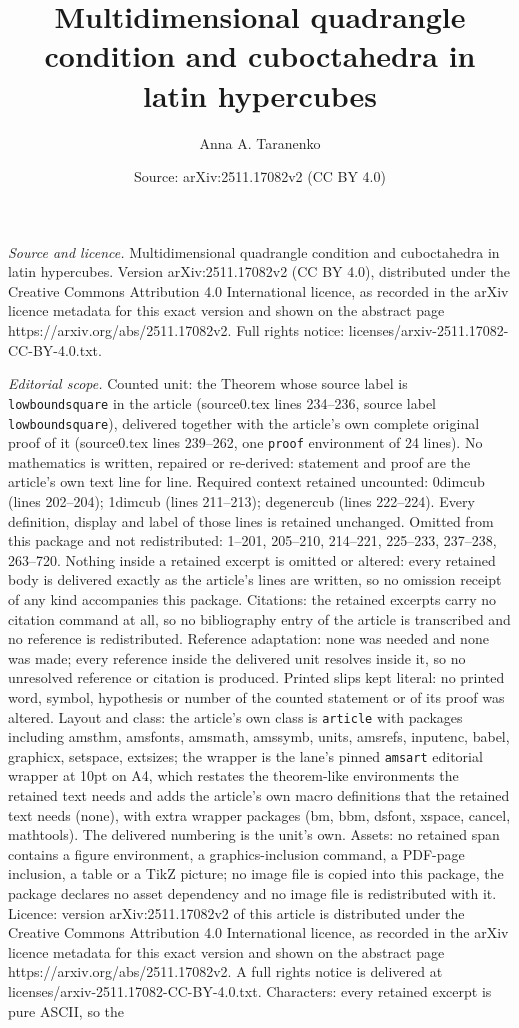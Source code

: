 \documentclass[10pt,a4paper]{amsart}
\title[Multidimensional quadrangle condition and cuboctahedra in la]{Multidimensional quadrangle condition and cuboctahedra in latin hypercubes}
\author{Anna A. Taranenko}
\date{Source: arXiv:2511.17082v2 (CC BY 4.0)}
\begin{document}
\maketitle

\noindent\emph{Source and licence.} Multidimensional quadrangle condition and cuboctahedra in latin hypercubes. Version arXiv:2511.17082v2 (CC BY 4.0), distributed under the Creative Commons Attribution 4.0 International licence, as recorded in the arXiv licence metadata for this exact version and shown on the abstract page https://arxiv.org/abs/2511.17082v2. Full rights notice: licenses/arxiv-2511.17082-CC-BY-4.0.txt.\par\smallskip

\noindent\textit{Editorial scope.} Counted unit: the Theorem whose source label is \texttt{lowboundsquare} in the article (source0.tex lines 234--236, source label \texttt{lowboundsquare}), delivered together with the article's own complete original proof of it (source0.tex lines 239--262, one \texttt{proof} environment of 24 lines). No mathematics is written, repaired or re-derived: statement and proof are the article's own text line for line. Required context retained uncounted: 0dimcub (lines 202--204); 1dimcub (lines 211--213); degenercub (lines 222--224). Every definition, display and label of those lines is retained unchanged. Omitted from this package and not redistributed: 1--201, 205--210, 214--221, 225--233, 237--238, 263--720. Nothing inside a retained excerpt is omitted or altered: every retained body is delivered exactly as the article's lines are written, so no omission receipt of any kind accompanies this package. Citations: the retained excerpts carry no citation command at all, so no bibliography entry of the article is transcribed and no reference is redistributed. Reference adaptation: none was needed and none was made; every reference inside the delivered unit resolves inside it, so no unresolved reference or citation is produced. Printed slips kept literal: no printed word, symbol, hypothesis or number of the counted statement or of its proof was altered. Layout and class: the article's own class is \texttt{article} with packages including amsthm, amsfonts, amsmath, amssymb, units, amsrefs, inputenc, babel, graphicx, setspace, extsizes; the wrapper is the lane's pinned \texttt{amsart} editorial wrapper at 10pt on A4, which restates the theorem-like environments the retained text needs and adds the article's own macro definitions that the retained text needs (none), with extra wrapper packages (bm, bbm, dsfont, xspace, cancel, mathtools). The delivered numbering is the unit's own. Assets: no retained span contains a figure environment, a graphics-inclusion command, a PDF-page inclusion, a table or a TikZ picture; no image file is copied into this package, the package declares no asset dependency and no image file is redistributed with it. Licence: version arXiv:2511.17082v2 of this article is distributed under the Creative Commons Attribution 4.0 International licence, as recorded in the arXiv licence metadata for this exact version and shown on the abstract page https://arxiv.org/abs/2511.17082v2. A full rights notice is delivered at licenses/arxiv-2511.17082-CC-BY-4.0.txt. Characters: every retained excerpt is pure ASCII, so the 
\end{document}
